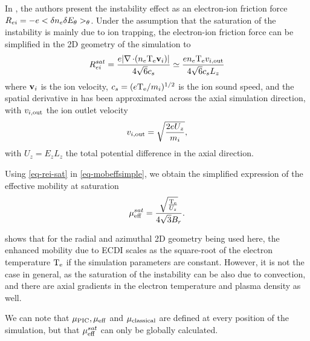   In  \citet{lafleur2016a}, the authors present the instability effect as an electron-ion friction force $R_{ei} = - e < \delta n_e \delta E_{\theta} >_{\theta}$.
  Under the assumption that the saturation of the instability is mainly due to ion trapping, the electron-ion friction force can be simplified in the \ac{2D} geometry of the simulation to
  \begin{equation} \label{eq-rei-sat}
    R_{ei}^{sat} = \frac{e \lvert\operatorname{{\mathbf \nabla}} \cdot (n_e \mathrm{T_e} {\mathbf v_i})\rvert}{4 \sqrt{6} c_s} \simeq \frac{e n_e \mathrm{T_e}  v_{i, \rm out} }{4 \sqrt 6 c_s L_z}
  \end{equation} 
  where ${\mathbf v_i}$ is the ion velocity, $c_s=(e \mathrm{T_e}/m_i)^{1/2}$  is the ion sound speed, and the spatial derivative in has been approximated across the axial simulation direction, with $ v_{i, \rm out} $ the ion outlet velocity 
  \begin{equation} \label{eq-viz}
     v_{i, \rm out}  = \sqrt{\frac{2 e U_z}{m_i}},
  \end{equation}
  with $U_z = E_z L_z$ the total potential difference in the axial direction.
  
  Using \cref{eq-rei-sat} in \cref{eq-mobeffsimple}, we obtain the simplified expression of the effective mobility at saturation
  \begin{equation} \label{eq-mobeffsat}
    \mu_{\mathrm{eff}}^{sat} = \frac{\sqrt{\frac{\mathrm{T_e}}{U_z}}}{4\sqrt{3}B_r}.
  \end{equation}
  
   shows that for the radial and azimuthal \ac{2D} geometry being used here, the enhanced mobility due to \ac{ECDI} scales as the square-root of the electron temperature $\mathrm{T_e}$ if the simulation parameters are constant.
  However, it is not the case in general, as the saturation of the instability can be also due to convection, and there are axial gradients in the electron temperature and plasma density as well.
  
  We can note that $\mu_{\mathrm{PIC}}, \mu_{\mathrm{eff}}$ and $\mu_{\mathrm{classical}}$ are defined at every position of the simulation, but that $\mu_{\mathrm{eff}}^{sat}$ can only be globally calculated. 
  
  
  
  
  